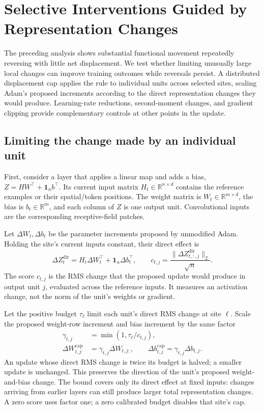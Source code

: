 \section{Selective Interventions Guided by Representation Changes}
\label{sec:vc-interventions}

The preceding analysis shows substantial functional movement repeatedly
reversing with little net displacement. We test whether limiting unusually
large local changes can improve training outcomes while reversals persist.
A distributed displacement cap applies the rule to individual units
across selected sites, scaling Adam's proposed increments according to
the direct representation changes they would produce. Learning-rate
reductions, second-moment changes, and gradient clipping provide
complementary controls at other points in the update.

\subsection{Limiting the change made by an individual unit}
First, consider a layer that applies a linear map and adds a bias,
$Z=HW^\top+\mathbf1_n b^\top$. Its current input matrix
$H_t\in\mathbb R^{n\times d}$ contains the reference examples or their
spatial/token positions. The weight matrix is
$W_t\in\mathbb R^{m\times d}$, the bias is $b_t\in\mathbb R^m$, and each
column of $Z$ is one output unit. Convolutional inputs are the
corresponding receptive-field patches.

Let $\Delta W_t,\Delta b_t$ be the parameter increments proposed by
unmodified Adam. Holding the site's current inputs constant, their
direct effect is
\begin{equation}
 \Delta Z_t^{\mathrm{dir}}=H_t\Delta W_t^\top+
       \mathbf1_n\Delta b_t^\top,\qquad
 c_{t,j}=\frac{\|\Delta Z_{t,:,j}^{\mathrm{dir}}\|_2}{\sqrt n}.
 \label{eq:vc-score}
\end{equation}
The score $c_{t,j}$ is the RMS change that the proposed update would
produce in output unit $j$, evaluated across the reference inputs.
It measures an activation change, not the norm of the unit's weights
or gradient.

Let the positive budget $\tau_\ell$ limit each unit's direct RMS change
at site $\ell$. Scale the proposed weight-row increment and bias
increment by the same factor
\begin{equation}
 \begin{aligned}
 \gamma_{t,j}&=\min(1,\tau_\ell/c_{t,j}),\\
 \Delta W^{\mathrm{cap}}_{t,j:}&=\gamma_{t,j}\Delta W_{t,j:},\qquad
 \Delta b^{\mathrm{cap}}_{t,j}=\gamma_{t,j}\Delta b_{t,j}.
 \end{aligned}
 \label{eq:vc-cap}
\end{equation}
An update whose direct RMS change is twice its budget is halved;
a smaller update is unchanged. This preserves the direction of the
unit's proposed weight-and-bias change. The bound covers only its
direct effect at fixed inputs: changes arriving from earlier layers
can still produce larger total representation changes. A zero score
uses factor one; a zero calibrated budget disables that site's cap.

